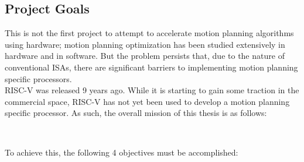 
\subsection{Project Goals}
This is not the first project to attempt to accelerate motion planning algorithms using hardware; motion planning optimization has been studied extensively in hardware and in software. But the problem persists that, due to the nature of conventional \glspl{ISA}, there are significant barriers to implementing motion planning specific processors. \\

RISC-V was released 9 years ago. While it is starting to gain some traction in the commercial space, RISC-V has not yet been used to develop a motion planning specific processor. As such, the overall mission of this thesis is as follows:

\begin{center}
\bigskip\noindent{} \\
\end{center}

\noindent To achieve this, the following 4 objectives must be accomplished:

\begin{center}
\bigskip\noindent{} \\
\end{center}


